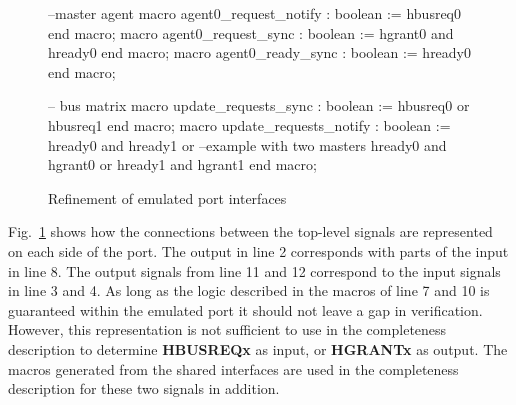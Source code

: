 \begin{figure}[h!]
\begin{VHI}
--master agent
macro agent0_request_notify : boolean := hbusreq0 end macro;
macro agent0_request_sync : boolean := hgrant0 and hready0 end macro;
macro agent0_ready_sync : boolean := hready0 end macro;

-- bus matrix
macro update_requests_sync : boolean := 
 hbusreq0 or hbusreq1 
end macro;
macro update_requests_notify : boolean :=
 hready0 and hready1 or --example with two masters
 hready0 and hgrant0 or
 hready1 and hgrant1
end macro;
\end{VHI}
\caption{Refinement of emulated port interfaces}
\label{fig:em-port-refine}
\end{figure}

Fig.~\ref{fig:em-port-refine} shows how the connections between the top-level signals are represented on each side of the port. The output in line 2 corresponds with parts of the input in line 8. The output signals from line 11 and 12 correspond to the input signals in line 3 and 4. As long as the logic described in the macros of line 7 and 10 is guaranteed within the emulated port it should not leave a gap in verification. However, this representation is not sufficient to use in the completeness description to determine \textbf{HBUSREQx} as input, or \textbf{HGRANTx} as output. The macros generated from the shared interfaces are used in the completeness description for these two signals in addition. 
  

